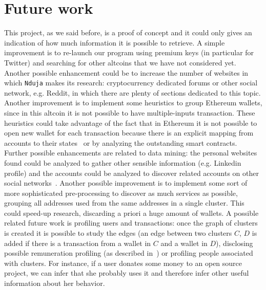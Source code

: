 \section{Future work}
\label{future}
This project, as we said before, is a proof of concept and it could only gives
an indication of how much information it is possible to retrieve. A simple
improvement
is to re-launch our program using premium keys (in particular for Twitter) and
searching for other altcoins that we have not considered yet. Another possible
enhancement could be to increase the number of websites in which \texttt{Nduja}
makes its research: cryptocurrency dedicated forums or other social network,
e.g. Reddit, in which there are plenty of sections dedicated to this topic.
Another
improvement is to implement some heuristics to group Ethereum wallets, since in
this altcoin it is not possible to have multiple-inputs transaction. These
heuristics could take advantage of the fact that in Ethereum it is
not possible to open new wallet for each transaction because there is an
explicit mapping from accounts to their states~\cite{bib:ethersok} or 
by analyzing the outstanding smart contracts.
Further possible enhancements are related to data mining: 
the personal websites found could be analyzed to gather other sensible
information (e.g. Linkedin profile) and the accounts could be analyzed to
discover related accounts on other social networks~\cite{bib:osinference}.
Another possible improvement is to implement some sort of more sophisticated
pre-processing to discover as much services as possible, grouping all addresses
used from the same addresses in a single cluster. This could speed-up research,
discarding a priori a huge amount of wallets. A possible related future work is
profiling users and transactions: once the graph of clusters is created it is
possible to study the edges (an edge between two clusters $C$, $D$ is added
if there is a transaction from a wallet in $C$ and a wallet in $D$), disclosing
possible remuneration profiling (as described in~\cite{bib:fullDiscl}) or
profiling people associated with clusters.
For instance, if a user donates some money to an open source project,
we can infer that she probably uses it and therefore infer other useful
information about her behavior.

